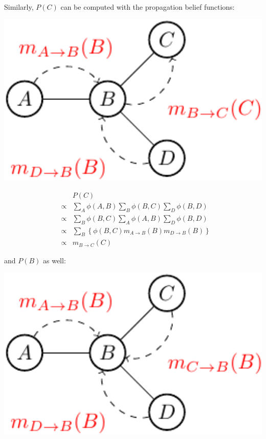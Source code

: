 Similarly, $P(C)$ can be computed with the propagation belief functions: 
\newline
\begin{minipage}[c]{0.4\textwidth}
      \centering
      \includegraphics[width=1.1\textwidth]{./Figures/message_passing_2}
\end{minipage}
\begin{minipage}[c]{0.6\textwidth}
 \begin{equation*}
  \begin{array}{rcl}
  & & P(C) \\
  &\propto& \sum_{A}\phi(A,B) \sum_B \phi(B,C) \sum_D \phi(B,D)\\ 
  &\propto& \sum_B \phi(B,C)  \sum_{A}\phi(A,B) \sum_D \phi(B,D)\\ 
  &\propto& \sum_{B} \left\{   \phi(B,C) m_{A\rightarrow B}(B) m_{D\rightarrow B}(B) \right\} \\
  &\propto& m_{B\rightarrow C}(C)
  \end{array}
 \end{equation*}
\end{minipage}
\newline 
\newline 
\newline 
and $P(B)$ as well:
\newline 
\newline 
\begin{minipage}[c]{0.4\textwidth}
      \centering
      \includegraphics[width=1.1\textwidth]{./Figures/message_passing_3}
\end{minipage}
